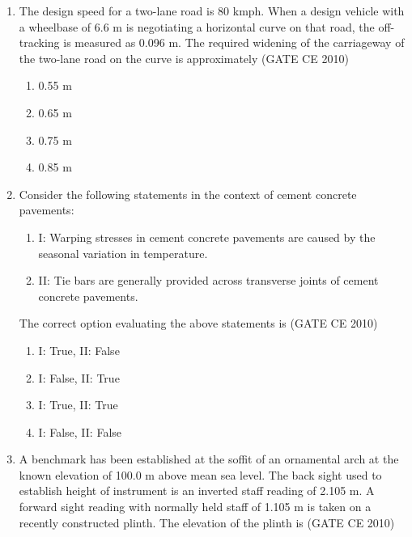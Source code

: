 \documentclass[journal]{IEEEtran}
\begin{document}
\begin{enumerate}
    \item The design speed for a two-lane road is 80 kmph. When a design vehicle with a wheelbase of 6.6 m is negotiating a horizontal curve on  
    that road, the off-tracking is measured as 0.096 m. The required widening of the carriageway of the two-lane road on the curve is approximately   \hfill (GATE CE 2010)

    \begin{multicols}{4}
        \begin{enumerate}
            \item 0.55 m
            \item 0.65 m
            \item 0.75 m
            \item 0.85 m
        \end{enumerate}
    \end{multicols}

    \item Consider the following statements in the context of cement concrete pavements:
    \begin{enumerate}
        \item[] I: Warping stresses in cement concrete pavements are caused by the seasonal variation in temperature.
        \item[] II: Tie bars are generally provided across transverse joints of cement concrete pavements.
    \end{enumerate}
    The correct option evaluating the above statements  
    is \hfill (GATE CE 2010)
    \begin{multicols}{2}
        \begin{enumerate}
            \item I: True, II: False
            \item I: False, II: True
            \item I: True, II: True
            \item I: False, II: False
        \end{enumerate}
    \end{multicols}


    \item A benchmark has been established at the soffit of an ornamental arch at the known elevation of 100.0 m above mean sea level. The back sight used to establish height of instrument is an inverted staff reading of 2.105 m. A forward sight reading with normally held staff of 1.105 m is taken on a recently constructed plinth. The elevation of the plinth is \hfill (GATE CE 2010)


\end{enumerate}
\end{document}
